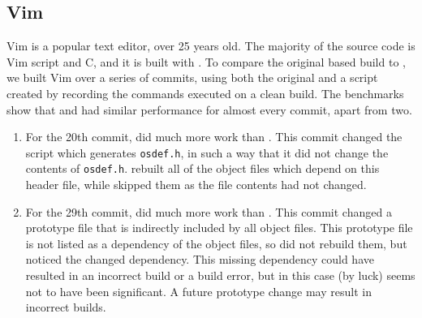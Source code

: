 \subsection{Vim}
\label{sec:eval:vim}


Vim is a popular text editor, over 25 years old. The majority of the source code is Vim script and C, and it is built with \Make. To compare the original \Make based build to \Rattle, we built Vim over a series of commits, using both the original \Make and a \Rattle script created by recording the commands \Make executed on a clean build. The benchmarks show that \Make and \Rattle had similar performance for almost every commit, apart from two.

\begin{enumerate}
\item For the 20th commit, \Make did much more work than \Rattle. This commit changed the script which generates \texttt{osdef.h}, in such a way that it did not change the contents of \texttt{osdef.h}. \Make rebuilt all of the object files which depend on this header file, while \Rattle skipped them as the file contents had not changed.
\item For the 29th commit, \Rattle did much more work than \Make. This commit changed a prototype file that is indirectly included by all object files.  This prototype file is not listed as a dependency of the object files, so \Make did not rebuild them, but \Rattle noticed the changed dependency.  This missing dependency could have resulted in an incorrect build or a build error, but in this case (by luck) seems not to have been significant. A future prototype change may result in incorrect builds.
\end{enumerate}

